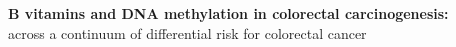 
\begin{titlepage}

\vspace*{\fill}
\begin{center}




\large{\textbf {B vitamins and DNA methylation in colorectal carcinogenesis:}}\\
\large {across a continuum of differential risk for colorectal cancer}


\end{center}

\vspace*{\fill}


\end{titlepage}